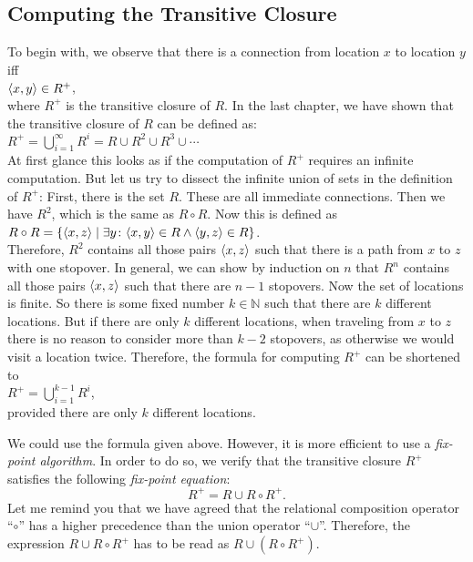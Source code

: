 \subsection{Computing the Transitive Closure}
To begin with, we observe that there is a connection from location $x$ to location $y$ iff
\\[0.2cm]
\hspace*{1.3cm}
$\pair(x,y) \in R^+$,
\\[0.2cm]
where $R^+$ is the transitive closure of $R$.  In the last chapter, we have shown that the
transitive closure of $R$ can be defined as: \\[0.2cm]
\hspace*{1.3cm}
$R^+ = \bigcup\limits_{i=1}^{\infty} R^i = R \cup R^2 \cup R^3 \cup \cdots$
\\[0.2cm]
At first glance this looks as if the computation of $R^+$ requires an infinite
computation.  But let us try to dissect the infinite union of sets in the definition of $R^+$:
First, there is the set $R$.  These are all immediate connections.  Then we have $R^2$,
which is the same as $R \circ R$.  Now this is defined as \\[0.2cm]
\hspace*{1.3cm} $R \circ R = \{ \pair(x,z) \mid \exists y \colon \pair(x,y) \in R \wedge \pair(y,z) \in R \}$.
\\[0.2cm]
Therefore,  $R^2$ contains all those pairs $\pair(x,z)$ such that there is a path from
$x$ to $z$ with one stopover.  In general, we can show by induction on $n$ that
$R^n$ contains all those pairs $\pair(x,z)$ such that there are $n-1$ stopovers.
Now the set of locations is finite.  So there is some fixed number $k \in \mathbb{N}$
such that there are $k$ different locations.  But if there are only $k$ different
locations, when traveling from $x$ to $z$ there is no reason to consider more than $k-2$
stopovers, as otherwise we would visit a location twice.  Therefore, the formula for
computing $R^+$ can be shortened to
\\[0.2cm]
\hspace*{1.3cm} $R^+ = \bigcup\limits_{i=1}^{k-1} R^i$, 
\\[0.2cm]
provided there are only $k$ different locations.

We could use the formula given above.  However, it is more efficient to use a
\emph{fix-point algorithm}.  In order to do so, we verify that the transitive closure $R^+$
satisfies the following \emph{fix-point equation}:
\begin{equation}
  \label{fixpunkt}
  R^+ = R \cup R \circ R^+. 
\end{equation}
Let me remind you that we have agreed that the relational composition operator ``$\circ$'' has
a higher precedence than the union operator ``$\cup$''.  Therefore, the expression $R \cup
R \circ R^+$ has to  
be read as $R \cup (R \circ R^+)$.

